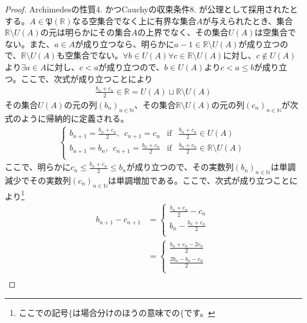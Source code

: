 \documentclass[dvipdfmx]{jsarticle}
\begin{document}
\begin{proof} Archimedesの性質4. かつCauchyの収束条件8. が公理として採用されたとする。$A \in \mathfrak{P}\left( \mathbb{R} \right)$なる空集合でなく上に有界な集合$A$が与えられたとき、集合$\mathbb{R} \setminus U(A)$の元は明らかにその集合$A$の上界でなく、その集合$U(A)$は空集合でない。また、$a \in A$が成り立つなら、明らかに$a - 1 \in \mathbb{R} \setminus U(A)$が成り立つので、$\mathbb{R} \setminus U(A)$も空集合でない。$\forall b \in U(A)\forall c \in \mathbb{R} \setminus U(A)$に対し、$c \notin U(A)$より$\exists a \in A$に対し、$c < a$が成り立つので、$b \in U(A)$より$c < a \leq b$が成り立つ。ここで、次式が成り立つことにより
\begin{align*}
\frac{b_{n} + c_{n}}{2} \in \mathbb{R} = U(A) \sqcup \mathbb{R} \setminus U(A)
\end{align*}
その集合$U(A)$の元の列$\left( b_{n} \right)_{n \in \mathbb{N}}$、その集合$\mathbb{R} \setminus U(A)$の元の列$\left( c_{n} \right)_{n \in \mathbb{N}}$が次式のように帰納的に定義される。
\begin{align*}
\left\{ \begin{matrix}
b_{n + 1} = \frac{b_{n} + c_{n}}{2},\ \ c_{n + 1} = c_{n} & \mathrm{if} & \frac{b_{n} + c_{n}}{2} \in U(A) \\
b_{n + 1} = b_{n},\ \ c_{n + 1} = \frac{b_{n} + c_{n}}{2} & \mathrm{if} & \frac{b_{n} + c_{n}}{2} \in \mathbb{R} \setminus U(A) \\
\end{matrix} \right.\ 
\end{align*}
ここで、明らかに$c_{n} \leq \frac{b_{n} + c_{n}}{2} \leq b_{n}$が成り立つので、その実数列$\left( b_{n} \right)_{n \in \mathbb{N}}$は単調減少でその実数列$\left( c_{n} \right)_{n \in \mathbb{N}}$は単調増加である。ここで、次式が成り立つことにより\footnote{ここでの記号$\{$は場合分けのほうの意味での$\{$です。}
\begin{align*}
b_{n + 1} - c_{n + 1} &= \left\{ \begin{matrix}
\frac{b_{n} + c_{n}}{2} - c_{n} \\
b_{n} - \frac{b_{n} + c_{n}}{2} \\
\end{matrix} \right.\ \\
&= \left\{ \begin{matrix}
\frac{b_{n} + c_{n} - 2c_{n}}{2} \\
\frac{2b_{n} - b_{n} - c_{n}}{2} \\
\end{matrix} \right.\ \\

\end{align*}
\end{proof}
\end{document}
